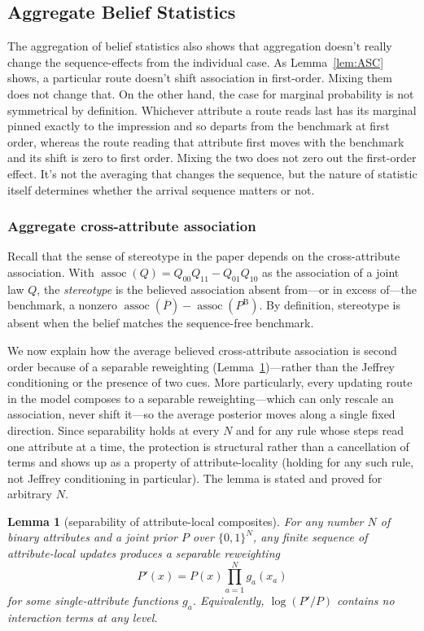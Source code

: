 \documentclass[a4paper,fleqn]{cas-sc}
\newtheorem{lemma}{Lemma}
\theoremstyle{remark}
\theoremstyle{definition}
\newcommand{\PB}{P^{\mathrm{B}}}
\newcommand{\Pbar}{\overline{P}}
\newcommand{\assoc}{\operatorname{assoc}}
\newcommand{\anchor}[1]{}
\begin{document}
\subsection{Aggregate Belief Statistics}
The aggregation of belief statistics also shows that aggregation doesn't really change the sequence-effects from the individual case. As Lemma~\ref{lem:ASC} shows, a particular route doesn't shift association in first-order. Mixing them does not change that. On the other hand, the case for marginal probability is not symmetrical by definition. Whichever attribute a route reads last has its marginal pinned exactly to the impression and so departs from the benchmark at first order, whereas the route reading that attribute first moves with the benchmark and its shift is zero to first order. Mixing the two does not zero out the first-order effect. It's not the averaging that changes the sequence, but the nature of statistic itself determines whether the arrival sequence matters or not.

\subsubsection{Aggregate cross-attribute association}
\label{sec:association}

Recall that the sense of stereotype in the paper depends on the cross-attribute association. With $\assoc(Q)=Q_{00}Q_{11}-Q_{01}Q_{10}$ as the association of a joint law $Q$, the \emph{stereotype} is the believed association absent from---or in excess of---the benchmark, a
nonzero $\assoc(\Pbar)-\assoc(\PB)$. By definition, stereotype is absent when the belief matches the sequence-free benchmark.

We now explain how the average believed cross-attribute association is second order because of a separable reweighting
(Lemma~\ref{lem:SEP})---rather than the Jeffrey conditioning or the presence of two cues. More particularly, every updating route in the model composes to a separable
reweighting---which can only rescale an association, never shift it---so the average posterior
moves along a single fixed direction. Since separability holds at every $N$ and for any rule whose steps read one attribute at a time, the protection is structural rather than a cancellation of terms and shows up as a property of attribute-locality (holding for any such rule, not Jeffrey
conditioning in particular). The lemma is stated and proved for arbitrary $N$.

\renewcommand{\thelemma}{SEP}%
\begin{lemma}[separability of attribute-local composites]\label{lem:SEP}
For any number $N$ of binary attributes and a joint prior $P$ over $\{0,1\}^{N}$, any finite
sequence of attribute-local updates produces a \emph{separable} reweighting
\[
  P'(x)=P(x)\prod_{a=1}^{N}g_{a}(x_{a})
\]
for some single-attribute functions $g_{a}$. Equivalently, $\log(P'/P)$ contains no interaction
terms at any level. \anchor{Lem.~SEP}
\end{lemma}
\end{document}
